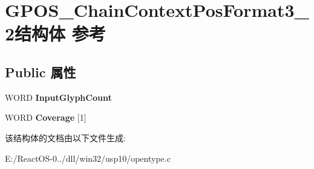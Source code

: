 \hypertarget{struct_g_p_o_s___chain_context_pos_format3__2}{}\section{G\+P\+O\+S\+\_\+\+Chain\+Context\+Pos\+Format3\+\_\+2结构体 参考}
\label{struct_g_p_o_s___chain_context_pos_format3__2}
\subsection*{Public 属性}
\begin{DoxyCompactItemize}
\item 
\mbox{\label{struct_g_p_o_s___chain_context_pos_format3__2_aa132b5afa0fb95f70dc5f92e47b88528}} 
W\+O\+RD {\bfseries Input\+Glyph\+Count}
\item 
\mbox{\label{struct_g_p_o_s___chain_context_pos_format3__2_a6dd4b3b9cd4a677825982e01e69ea2c5}} 
W\+O\+RD {\bfseries Coverage} \mbox{[}1\mbox{]}
\end{DoxyCompactItemize}


该结构体的文档由以下文件生成\+:\begin{DoxyCompactItemize}
\item 
E\+:/\+React\+O\+S-\/0../dll/win32/usp10/opentype.\+c\end{DoxyCompactItemize}
